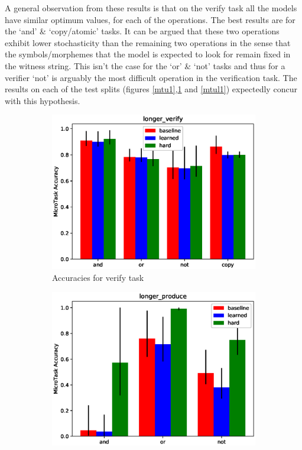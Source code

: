 A general observation from these results is that on the verify task all the models have similar optimum values, for each of the operations. The best results are for the \lq and\rq{} \& \lq copy/atomic\rq{} tasks. It can be argued that these two operations exhibit lower stochasticity than the remaining two operations in the sense that the symbols/morphemes that the model is expected to look for remain fixed in the witness string. This isn't the case for the \lq or\rq{} \& \lq not\rq{} tasks and thus for a verifier \lq not\rq{} is arguably the most difficult operation in the verification task. The results on each of the test splits (figures \ref{mtu1},\ref{mtl1} and \ref{mtul1}) expectedly concur with this hypothesis.
\begin{figure}[ht] 
	\begin{subfigure}[b]{0.5\linewidth}
		\centering
		\includegraphics[width=0.95\linewidth]{./figs/micro/longer_verify}
		\caption{Accuracies for verify task } 
		\label{mtl1} 
		\vspace{2ex}
	\end{subfigure}%
	\begin{subfigure}[b]{0.5\linewidth}
		\centering
		\includegraphics[width=0.95\linewidth]{./figs/micro/longer_produce}

\end{subfigure}
\end{figure}

